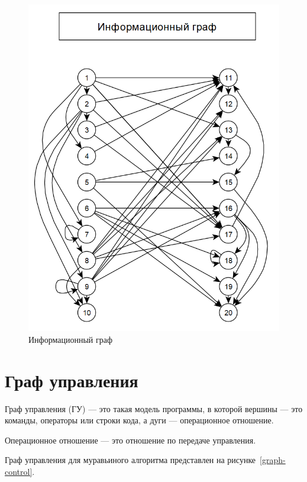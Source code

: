 \documentclass[a4paper, 12pt]{extreport}
\begin{document}
\begin{figure}[h]
	\centering
	\includegraphics[scale=1]{tools/graph-inf.png}
	\caption{Информационный граф}
	\label{graph-inf}
\end{figure}

\chapter{Граф управления}

Граф управления (ГУ) --- это такая модель программы, в которой вершины --- это команды, операторы или строки кода, а дуги 
--- операционное отношение.

Операционное отношение --- это отношение по передаче управления.

Граф управления для муравьиного алгоритма представлен на рисунке~\ref{graph-control}.
\end{document}
